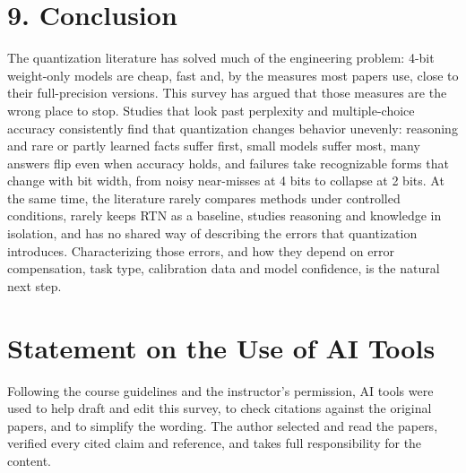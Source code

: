 \documentclass[10pt,twocolumn]{article}
\begin{document}
\section{9. Conclusion}

The quantization literature has solved much of the engineering problem:
4-bit weight-only models are cheap, fast and, by the measures most
papers use, close to their full-precision versions. This survey has
argued that those measures are the wrong place to stop. Studies that
look past perplexity and multiple-choice accuracy consistently find that
quantization changes behavior unevenly: reasoning and rare or partly
learned facts suffer first, small models suffer most, many answers flip
even when accuracy holds, and failures take recognizable forms that
change with bit width, from noisy near-misses at 4 bits to collapse at 2
bits. At the same time, the literature rarely compares methods under
controlled conditions, rarely keeps RTN as a baseline, studies reasoning
and knowledge in isolation, and has no shared way of describing the
errors that quantization introduces. Characterizing those errors, and
how they depend on error compensation, task type, calibration data and
model confidence, is the natural next step.

\section{Statement on the Use of AI Tools}

Following the course guidelines and the instructor's permission, AI
tools were used to help draft and edit this survey, to check citations
against the original papers, and to simplify the wording. The author
selected and read the papers, verified every cited claim and reference,
and takes full responsibility for the content.
\end{document}
